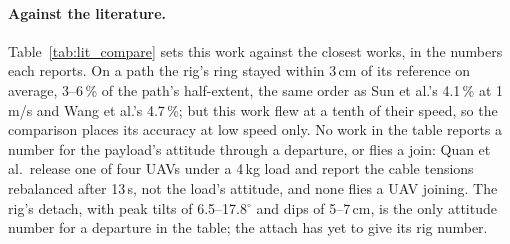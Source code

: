 \paragraph{Against the literature.} Table~\ref{tab:lit_compare} sets this work against the closest works,
in the numbers each reports. On a path the rig's ring stayed within 3\,cm of its reference on average, 3--6\,\%
of the path's half-extent, the same order as Sun et al.'s 4.1\,\% at 1\,m/s and Wang et al.'s 4.7\,\%; but this
work flew at a tenth of their speed, so the comparison places its accuracy at low speed only. No work in
the table reports a number for the payload's attitude through a departure, or flies a join: Quan et al.\ release one of four
UAVs under a 4\,kg load and report the cable tensions rebalanced after 13\,s, not the load's attitude, and none
flies a UAV joining. The rig's detach, with peak tilts of 6.5--17.8$^\circ$ and dips of 5--7\,cm, is the only
attitude number for a departure in the table; the attach has yet to give its rig number.

